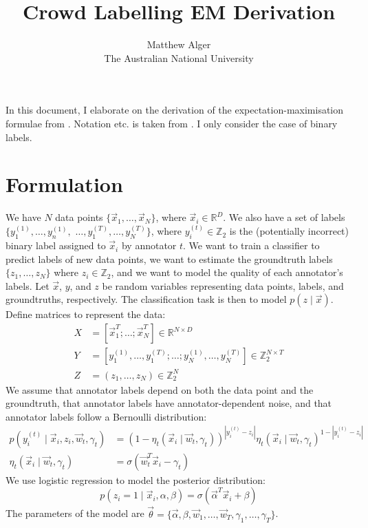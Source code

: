 \documentclass[a4paper]{article}
\begin{document}
    \title{Crowd Labelling EM Derivation}
    \author{Matthew Alger\\The Australian National University}
    \maketitle

    In this document, I elaborate on the derivation of the expectation-maximisation formulae from \citet{yan10}. Notation etc. is taken from \citet{yan10}. I only consider the case of binary labels.

    \section{Formulation}
 
        We have $N$ data points $\{\vec x_1, \dots, \vec x_N\}$, where $\vec x_i \in \mathbb{R}^D$. We also have a set of labels $\{y_1^{(1)}, \dots, y_n^{(1)},$ $\dots, y_1^{(T)}, \dots, y_N^{(T)}\}$, where $y_i^{(t)} \in \mathbb{Z}_2$ is the (potentially incorrect) binary label assigned to $\vec x_i$ by annotator $t$. We want to train a classifier to predict labels of new data points, we want to estimate the groundtruth labels $\{z_1, \dots, z_N\}$ where $z_i \in \mathbb{Z}_2$, and we want to model the quality of each annotator's labels. Let $\vec x$, $y$, and $z$ be random variables representing data points, labels, and groundtruths, respectively. The classification task is then to model $p(z \mid \vec x)$.
        Define matrices to represent the data:
        \begin{align*}
            X &= [\vec x_1^T; \dots; \vec x_N^T] \in \mathbb{R}^{N \times D}\\
            Y &= [y_1^{(1)}, \dots, y_1^{(T)}; \dots; y_N^{(1)}, \dots, y_N^{(T)}] \in \mathbb{Z}_2^{N \times T}\\
            Z &= (z_1, \dots, z_N) \in \mathbb{Z}_2^N
        \end{align*}
        We assume that annotator labels depend on both the data point and the groundtruth, that annotator labels have annotator-dependent noise, and that annotator labels follow a Bernoulli distribution:
        \begin{align*}
            p(y_i^{(t)} \mid \vec x_i, z_i, \vec w_t, \gamma_t) &= (1 - \eta_t(\vec x_i \mid \vec w_t, \gamma_t))^{|y_i^{(t)} - z_i|} \eta_t(\vec x_i \mid \vec w_t, \gamma_t)^{1 - |y_i^{(t)} - z_i|}\\
            \eta_t(\vec x_i \mid \vec w_t, \gamma_t) &= \sigma(\vec w_t^T \vec x_i - \gamma_t)
        \end{align*}
        We use logistic regression to model the posterior distribution:
        \[
            p(z_i = 1 \mid \vec x_i, \alpha, \beta) = \sigma(\vec \alpha^T \vec x_i + \beta)
        \]
        The parameters of the model are $\vec \theta = \{\vec \alpha, \beta, \vec w_1, \dots, \vec w_T, \gamma_1, \dots, \gamma_T\}$.
\end{document}
